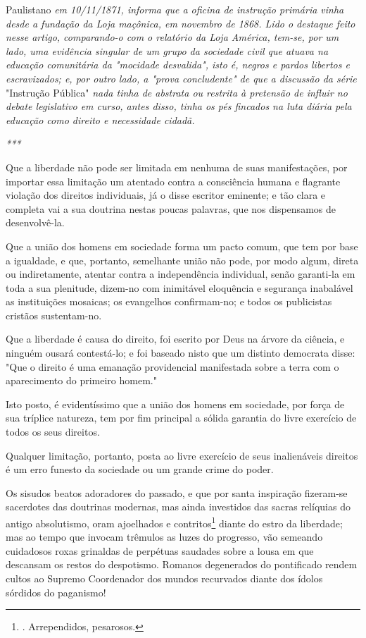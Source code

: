 Paulistano \emph{em 10/11/1871, informa que a oficina de instrução
primária vinha desde a fundação da Loja maçônica, em novembro de 1868.
Lido o destaque feito nesse artigo, comparando-o com o relatório da Loja
América, tem-se, por um lado, uma evidência singular de um grupo da
sociedade civil que atuava na educação comunitária da "mocidade
desvalida", isto é, negros e pardos libertos e escravizados; e, por
outro lado, a "prova concludente" de que a discussão da série}
"Instrução Pública" \emph{nada tinha de abstrata ou restrita à pretensão
de influir no debate legislativo em curso, antes disso, tinha os pés
fincados na luta diária pela educação como direito e necessidade
cidadã.}

\emph{***}

Que a liberdade não pode ser limitada em nenhuma de suas manifestações,
por importar essa limitação um atentado contra a consciência humana e
flagrante violação dos direitos individuais, já o disse escritor
eminente; e tão clara e completa vai a sua doutrina nestas poucas
palavras, que nos dispensamos de desenvolvê-la.

Que a união dos homens em sociedade forma um pacto comum, que tem por
base a igualdade, e que, portanto, semelhante união não pode, por modo
algum, direta ou indiretamente, atentar contra a independência
individual, senão garanti-la em toda a sua plenitude, dizem-no com
inimitável eloquência e segurança inabalável as instituições mosaicas;
os evangelhos confirmam-no; e todos os publicistas cristãos
sustentam-no.

Que a liberdade é causa do direito, foi escrito por Deus na árvore da
ciência, e ninguém ousará contestá-lo; e foi baseado nisto que um
distinto democrata disse: "Que o direito é uma emanação providencial
manifestada sobre a terra com o aparecimento do primeiro homem."

Isto posto, é evidentíssimo que a união dos homens em sociedade, por
força de sua tríplice natureza, tem por fim principal a sólida garantia
do livre exercício de todos os seus direitos.

Qualquer limitação, portanto, posta ao livre exercício de seus
inalienáveis direitos é um erro funesto da sociedade ou um grande crime
do poder.

Os sisudos beatos adoradores do passado, e que por santa inspiração
fizeram-se sacerdotes das doutrinas modernas, mas ainda investidos das
sacras relíquias do antigo absolutismo, oram ajoelhados e
contritos\footnote{. Arrependidos, pesarosos.} diante do estro da
liberdade; mas ao tempo que invocam trêmulos as luzes do progresso, vão
semeando cuidadosos roxas grinaldas de perpétuas saudades sobre a lousa
em que descansam os restos do despotismo. Romanos degenerados do
pontificado rendem cultos ao Supremo Coordenador dos mundos recurvados
diante dos ídolos sórdidos do paganismo!

